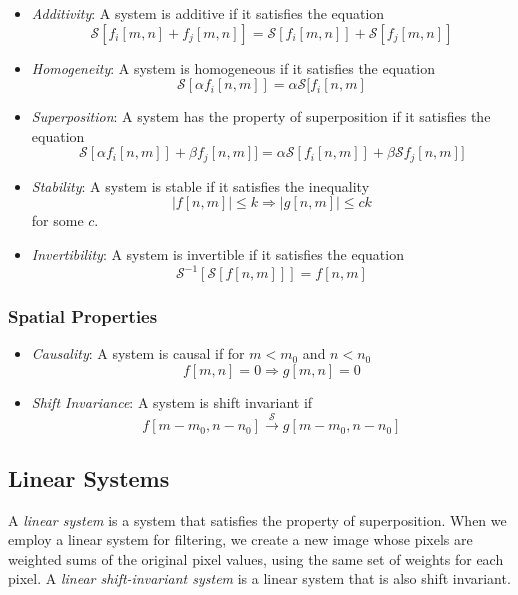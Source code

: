 \documentclass{article}
\begin{document}
\begin{itemize}
	\item \emph{Additivity}: A system is additive if it satisfies the equation
    \[
    	\mathcal{S}[f_i[m, n] + f_j[m, n]] = \mathcal{S}[f_i[m, n]] + \mathcal{S}[f_j[m, n]]
    \]
    
    \item  \emph{Homogeneity}: A system is homogeneous if it satisfies the equation 
    \[
		\mathcal{S}[\alpha f_i[n, m]] = \alpha\mathcal{S}[f_i[n, m]
    \]
	
    \item \emph{Superposition}: A system has the property of superposition if it satisfies the equation 
    \[
    	\mathcal{S}[\alpha f_i[n, m]] + \beta f_j[n, m]] = \alpha\mathcal{S}[f_i[n, m]] + \beta\mathcal{S}f_j[n, m]]
    \]
    
	\item \emph{Stability}: A system is stable if it satisfies the inequality 
    \[
    	\left\vert f[n, m] \right\vert \leq k \Longrightarrow \left\vert	g[n, m] \right\vert \leq ck
    \]
    for some $c$.
	
    \item \emph{Invertibility}: A system is invertible if it satisfies the equation
    \[
    	\mathcal{S}^{-1}[\mathcal{S}[f[n, m]]] = f[n, m]
    \]
\end{itemize}

\subsubsection*{Spatial Properties}

\begin{itemize}
	\item \emph{Causality}: A system is causal if for $m < m_0$ and $n < n_0$
    \[
    	f[m, n] = 0 \Longrightarrow g[m, n] = 0
    \]
    
    \item \emph{Shift Invariance}: A system is shift invariant if
    \[
    	f[m - m_0, n - n_0] \xrightarrow{\mathcal{S}} g[m - m_0, n - n_0]
    \]    
\end{itemize}

\subsection{Linear Systems}

A \emph{linear system} is a system that satisfies the property of superposition. When we employ a linear system for filtering, we create a new image whose pixels are weighted sums of the original pixel values, using the same set of weights for each pixel. A \emph{linear shift-invariant system} is a linear system that is also shift invariant. 
\end{document}
